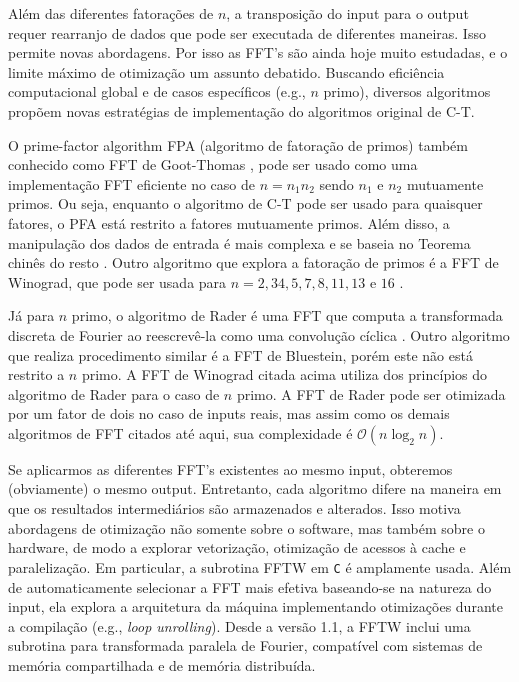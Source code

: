 Além das diferentes fatorações de $n$, a transposição do input para o output requer rearranjo de dados que pode ser executada de diferentes maneiras. Isso permite novas abordagens. Por isso as FFT's são ainda hoje muito estudadas, e o limite máximo de otimização um assunto debatido. Buscando eficiência computacional global e de casos específicos (e.g., $n$ primo), diversos algoritmos propõem novas estratégias de implementação do algoritmos original de C-T. 

O prime-factor algorithm FPA (algoritmo de fatoração de primos) também conhecido como FFT de Goot-Thomas \cite{good1958interaction}, pode ser usado como uma implementação FFT eficiente no caso de $n = n_1 n_2$ sendo $n_1$ e $n_2$ mutuamente primos. Ou seja, enquanto o algoritmo de C-T pode ser usado para quaisquer fatores, o PFA está restrito a fatores mutuamente primos. Além disso, a manipulação dos dados de entrada é mais complexa e se baseia no Teorema chinês do resto \cite{cr}. Outro algoritmo que explora a fatoração de primos é a FFT de Winograd, que pode ser usada para $n = 2, 3 4, 5, 7, 8, 11, 13$ e $16$ \cite{ftmw}.

Já para $n$ primo, o algoritmo de Rader é uma FFT que computa a transformada discreta de Fourier ao reescrevê-la como uma convolução cíclica \cite{rader1968discrete}. Outro algoritmo que realiza procedimento similar é a FFT de Bluestein, porém este não está restrito a $n$ primo. A FFT de Winograd citada acima utiliza dos princípios do algoritmo de Rader para o caso de $n$ primo. A FFT de Rader pode ser otimizada por um fator de dois no caso de inputs reais, mas assim como os demais algoritmos de FFT citados até aqui, sua complexidade é $\mathcal{O}(n\log_{2}n)$.

Se aplicarmos as diferentes FFT's existentes ao mesmo input, obteremos (obviamente) o mesmo output. Entretanto, cada algoritmo difere na maneira em que os resultados intermediários são armazenados e alterados. Isso motiva abordagens de otimização não somente sobre o software, mas também sobre o hardware, de modo a explorar vetorização, otimização de acessos à cache e paralelização. Em particular, a subrotina FFTW \cite{frigo1998fftw} em \texttt{C} é amplamente usada. Além de automaticamente selecionar a FFT mais efetiva baseando-se na natureza do input, ela explora a arquitetura da máquina implementando otimizações durante a compilação (e.g., \textit{loop unrolling}). Desde a versão 1.1, a FFTW inclui uma subrotina para transformada paralela de Fourier, compatível com sistemas de memória compartilhada e de memória distribuída. 

